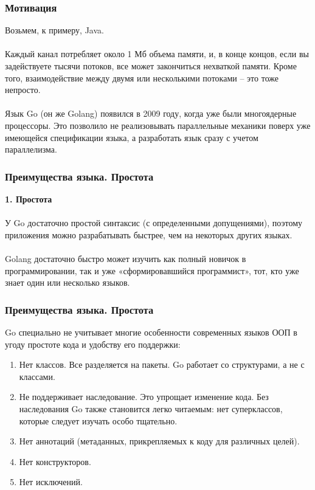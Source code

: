\documentclass{beamer}
\begin{document}
\begin{frame}[fragile] \frametitle{Мотивация}
  Возьмем, к примеру, Java. 
  \\\\
  Каждый канал потребляет около 1 Мб объема памяти, и, в конце концов, если вы
  задействуете тысячи потоков, все может закончиться нехваткой памяти. Кроме
  того, взаимодействие между двумя или несколькими потоками – это тоже непросто.
  \\\\
  Язык Go (он же Golang) появился в 2009 году, когда уже были многоядерные
  процессоры. Это позволило не реализовывать параллельные механики поверх уже
  имеющейся спецификации языка, а разработать язык сразу с учетом параллелизма. 
\end{frame}
\begin{frame}[fragile] \frametitle{Преимущества языка. Простота}
  \textbf{1. Простота} 
  \\\\
  У Go достаточно простой синтаксис (с определенными допущениями), поэтому
  приложения можно разрабатывать быстрее, чем на некоторых других языках.
  \\\\
  Golang достаточно быстро может изучить как полный новичок в
  программировании, так и уже «сформировавшийся программист», тот, кто уже знает
  один или несколько языков.
\end{frame}
\begin{frame}[fragile] \frametitle{Преимущества языка. Простота}
  Go специально не учитывает многие особенности современных языков ООП в угоду
  простоте кода и удобству его поддержки:
  \begin{enumerate}
    \item Нет классов. Все разделяется на пакеты. Go работает со структурами, а
    не с классами.
    \item Не поддерживает наследование. Это упрощает изменение кода. Без
    наследования Go также становится легко читаемым: нет суперклассов, которые
    следует изучать особо тщательно.
    \item Нет аннотаций (метаданных, прикрепляемых к коду для различных целей).
    \item Нет конструкторов.
    \item Нет исключений.
  \end{enumerate}
\end{frame}
\end{document}
